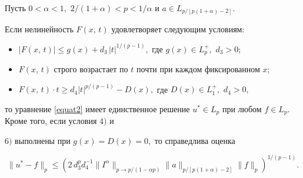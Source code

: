\begin{theorem}[2]Пусть $0<\alpha<1,$ $2/(1+\alpha)<p<1/\alpha$ и $a\in L_{p/[p(1+\alpha)-2]}.$

Если нелинейность $F(x,\,t)$ удовлетворяет следующим условиям{\/\rm:}

\begin{itemize}



\item[{\rm 4)}] $|F(x,\,t)|\leq g(x)+d_3\,|t|^{1/(p-1)},$ где $g(x)\in L_p^+,$ $d_3>0;$



\item[{\rm 5)}] $F(x,\,t)$ строго возрастает по $t$ почти при каждом фиксированном $x;$



\item[{\rm 6)}] $F(x,\,t)\cdot t\geq d_4 |t|^{p/(p-1)}-D(x),$ где $D(x)\in L_1^+,$ $d_4>0,$



\end{itemize}

то уравнение \eqref{equat2} имеет единственное решение $u^*\in L_p$ при любом $f\in L_p$. Кроме того, если условия $4)$ и

$6)$ выполнены при $g(x)=D(x)=0,$ то справедлива оценка

\begin{equation}

\label{estim2}

\|u^*-f\|_p\leq \left(2\,d_3^pd_4^{-1}\|I^\alpha\|_{p\to p/(1-\alpha p)}\|a\|_{p/[p(1+\alpha)-2]}\|f\|_p\right)^{1/(p-1)}.

\end{equation}

\end{theorem}



